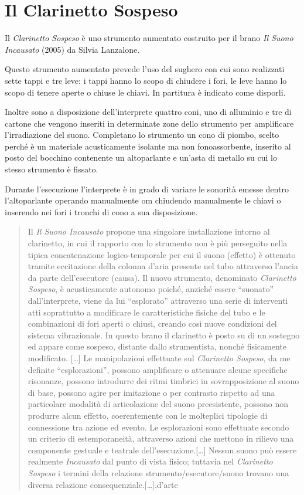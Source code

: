 \section{Il Clarinetto Sospeso}

Il \emph{Clarinetto Sospeso} è uno strumento aumentato costruito per il brano
\emph{Il Suono Incausato} (2005) da Silvia Lanzalone.

Questo strumento aumentato prevede l’uso del sughero con cui sono realizzati
sette tappi e tre leve: i tappi hanno lo scopo di chiudere i fori, le  leve
hanno lo scopo di tenere aperte o chiuse le chiavi. In partitura è indicato come
disporli.

Inoltre sono a disposizione dell’interprete quattro coni, uno di alluminio e tre
di cartone che vengono inseriti in determinate zone dello strumento per
amplificare l’irradiazione del suono. Completano lo strumento un cono di
piombo, scelto perché è un materiale acusticamente isolante ma non
fonoassorbente, inserito al posto del bocchino contenente un altoparlante e
un’asta di metallo su cui lo stesso strumento è fissato.

Durante l’esecuzione l’interprete è in grado di variare le sonorità emesse
dentro l’altoparlante operando manualmente om chiudendo manualmente le chiavi o
inserendo nei fori i tronchi di cono a sua disposizione.

\begin{quote}
Il \emph{Il Suono Incausato} propone una singolare installazione intorno al
clarinetto, in cui il rapporto con lo strumento non è più perseguito nella
tipica concatenazione logico-temporale per cui il suono (effetto) è ottenuto
tramite eccitazione della colonna d’aria presente nel tubo attraverso l’ancia
da parte dell’esecutore (causa). Il nuovo strumento, denominato
\emph{Clarinetto Sospeso}, è acusticamente autonomo poiché, anziché essere
“suonato” dall’interprete, viene da lui “esplorato” attraverso una serie di
interventi atti soprattutto a modificare le caratteristiche fisiche del tubo e
le combinazioni di fori aperti o chiusi, creando così nuove condizioni del
sistema vibrazionale. In questo brano il clarinetto è posto su di un sostegno
ed appare come sospeso, distante dallo strumentista, nonché fisicamente
modificato. [\ldots] Le manipolazioni effettuate sul \emph{Clarinetto Sospeso}, da
me definite “esplorazioni”, possono amplificare o attenuare alcune specifiche
risonanze, possono introdurre dei ritmi timbrici in sovrapposizione al suono di
base, possono agire per imitazione o per contrasto rispetto ad una particolare
modalità di articolazione del suono preesistente, possono non produrre alcun
effetto, coerentemente con le molteplici tipologie di connessione tra azione ed
evento. Le esplorazioni sono effettuate secondo un criterio di estemporaneità,
attraverso azioni che mettono in rilievo una componente gestuale e teatrale
dell’esecuzione.[\ldots]
Nessun suono può essere realmente \emph{Incausato} dal punto di vista fisico;
tuttavia nel \emph{Clarinetto Sospeso} i termini della relazione strumento/esecutore/suono
trovano una diversa relazione consequenziale.[…].d’arte
\end{quote}

